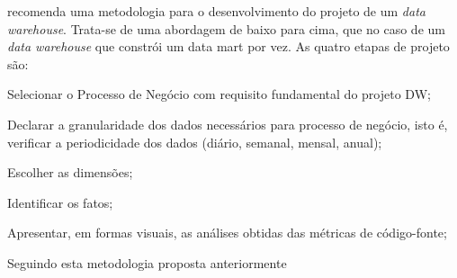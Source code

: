  recomenda uma metodologia para o desenvolvimento
do projeto de um \textit{data warehouse}. 
Trata-se de uma abordagem de baixo para cima, que no caso de um 
\textit{data warehouse} que constrói um data mart por vez. As quatro etapas de 
projeto são:


\begin{steps}
	\item Selecionar o Processo de Negócio com requisito fundamental do projeto 
	DW;
	
	\item Declarar a granularidade dos dados necessários para processo de 
	negócio, isto é, verificar a periodicidade dos dados 
	(diário, semanal, mensal, anual);
	
	\item Escolher as dimensões;
	
	\item Identificar os fatos;
	
	\item Apresentar, em formas visuais, as análises obtidas das métricas de 
	código-fonte;
	
    \end{steps}


	Seguindo esta metodologia proposta anteriormente

	